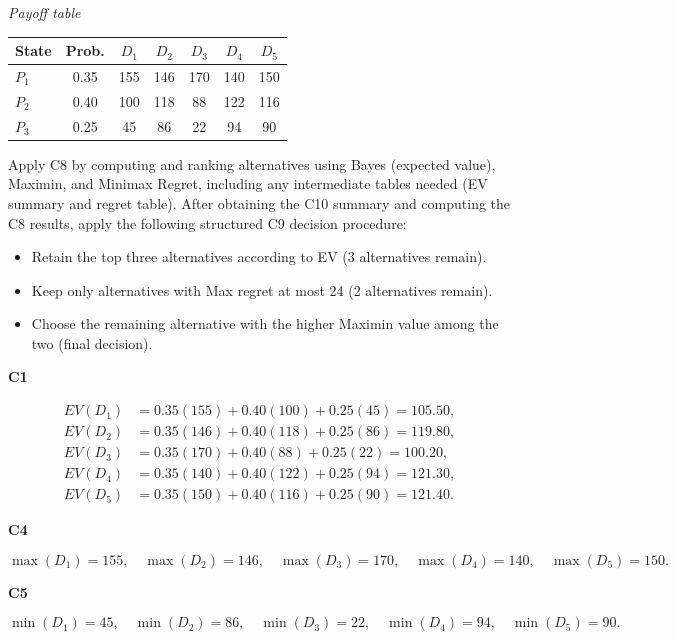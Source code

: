 \begin{ExamProblems}
		\begin{center}
			\textit{Payoff table} \\
			\begin{tabular}{l c c c c c c}
				\hline
				State& Prob. & $D_1$ & $D_2$ & $D_3$ & $D_4$ & $D_5$ \\
				\hline
				$P_1$ & 0.35 & 155 & 146 & 170 & 140 & 150 \\
				$P_2$ & 0.40 & 100 & 118 & 88 & 122 & 116 \\
				$P_3$ & 0.25 & 45 & 86 & 22 & 94 & 90 \\
				\hline
			\end{tabular}
		\end{center}
		
		Apply C8 by computing and ranking alternatives using Bayes (expected value), Maximin, and Minimax Regret, including any intermediate tables needed (EV summary and regret table).
		After obtaining the C10 summary and computing the C8 results, apply the following structured C9 decision procedure:
		\begin{itemize}
			\item Retain the top three alternatives according to EV (3 alternatives remain).
			\item Keep only alternatives with Max regret at most 24 (2 alternatives remain).
			\item Choose the remaining alternative with the higher Maximin value among the two (final decision).
		\end{itemize}
		
		\vspace{0.25cm}
		
		\textbf{C1}\par
				\[
		\begin{aligned}
			EV(D_1)&=0.35(155)+0.40(100)+0.25(45)=105.50,\\
			EV(D_2)&=0.35(146)+0.40(118)+0.25(86)=119.80,\\
			EV(D_3)&=0.35(170)+0.40(88)+0.25(22)=100.20,\\
			EV(D_4)&=0.35(140)+0.40(122)+0.25(94)=121.30,\\
			EV(D_5)&=0.35(150)+0.40(116)+0.25(90)=121.40.
		\end{aligned}
		\]
		

		\textbf{C4}\par
				\[
		\max(D_1)=155,\quad \max(D_2)=146,\quad \max(D_3)=170,\quad \max(D_4)=140,\quad \max(D_5)=150.
		\]
		

		\textbf{C5}\par
				\[
		\min(D_1)=45,\quad \min(D_2)=86,\quad \min(D_3)=22,\quad \min(D_4)=94,\quad \min(D_5)=90.
		\]
		



\end{ExamProblems}
